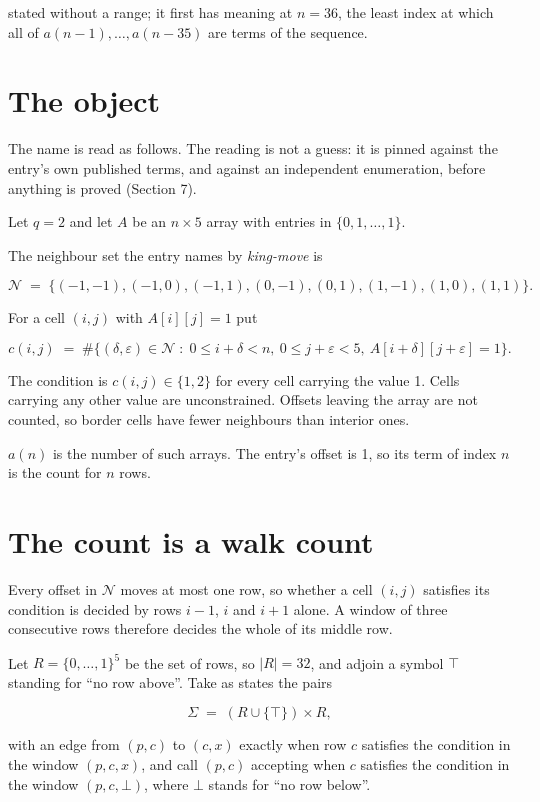 \documentclass[11pt]{article}
\theoremstyle{definition}
\begin{document}
stated without a range; it first has meaning at $n = 36$, the least index at which all of $a(n-1),\dots,a(n-35)$ are terms of the sequence.

\section{The object}

The name is read as follows. The reading is not a guess: it is pinned against the entry's own published terms, and against an independent enumeration, before anything is proved (Section 7).

Let $q = 2$ and let $A$ be an $n \times 5$ array with entries in $\{0,1,\dots,1\}$.

The neighbour set the entry names by {\itshape king-move} is

\[\mathcal{N} \;=\; \{(-1,-1), (-1,0), (-1,1), (0,-1), (0,1), (1,-1), (1,0), (1,1)\}.\]

For a cell $(i,j)$ with $A[i][j] = 1$ put

\[c(i,j) \;=\; \#\bigl\{(\delta,\varepsilon)\in\mathcal{N} \;:\; 0\le i+\delta<n,\ 0\le j+\varepsilon<5,\ A[i+\delta][j+\varepsilon] = 1\bigr\}.\]

The condition is $c(i,j) \in \{1, 2\}$ for every cell carrying the value 1. Cells carrying any other value are unconstrained. Offsets leaving the array are not counted, so border cells have fewer neighbours than interior ones.

$a(n)$ is the number of such arrays. The entry's offset is 1, so its term of index $n$ is the count for $n$ rows.

\section{The count is a walk count}

Every offset in $\mathcal{N}$ moves at most one row, so whether a cell $(i,j)$ satisfies its condition is decided by rows $i-1$, $i$ and $i+1$ alone. A window of three consecutive rows therefore decides the whole of its middle row.

Let $R = \{0,\dots,1\}^{5}$ be the set of rows, so $|R| = 32$, and adjoin a symbol $\top$ standing for ``no row above''. Take as states the pairs

\[\Sigma \;=\; (R \cup \{\top\}) \times R,\]

with an edge from $(p,c)$ to $(c,x)$ exactly when row $c$ satisfies the condition in the window $(p,c,x)$, and call $(p,c)$ accepting when $c$ satisfies the condition in the window $(p,c,\bot)$, where $\bot$ stands for ``no row below''.
\end{document}
